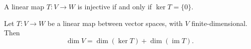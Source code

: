 \begin{proposition}
  A linear map $T: V \to W$ is injective if and only if $\ker T = \{0\}$.
\end{proposition}

\begin{theorem}
  Let $T: V \to W$ be a linear map between vector spaces, with $V$ finite-dimensional. Then
  \[
    \dim V = \dim (\ker T) + \dim (\operatorname{im} T).
  \]
\end{theorem}
